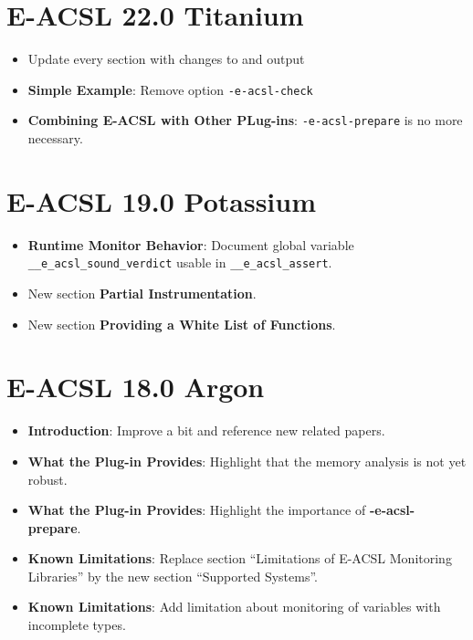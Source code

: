 \section*{E-ACSL 22.0 Titanium}

\begin{itemize}
\item Update every section with changes to \framac and \eacslgcc output
\item \textbf{Simple Example}: Remove option \texttt{-e-acsl-check}
\item \textbf{Combining E-ACSL with Other PLug-ins}: \texttt{-e-acsl-prepare} is
  no more necessary.
\end{itemize}

\section*{E-ACSL 19.0 Potassium}

\begin{itemize}
\item \textbf{Runtime Monitor Behavior}: Document global variable
  \texttt{\_\_e\_acsl\_sound\_verdict} usable in \texttt{\_\_e\_acsl\_assert}.
\item New section \textbf{Partial Instrumentation}.
\item New section \textbf{Providing a White List of Functions}.
\end{itemize}

\section*{E-ACSL 18.0 Argon}

\begin{itemize}
\item \textbf{Introduction}: Improve a bit and reference new related papers.
\item \textbf{What the Plug-in Provides}: Highlight that the memory analysis is
  not yet robust.
\item \textbf{What the Plug-in Provides}: Highlight the importance of
  \textbf{-e-acsl-prepare}.
\item \textbf{Known Limitations}: Replace section ``Limitations of E-ACSL
  Monitoring Libraries'' by the new section ``Supported Systems''.
\item \textbf{Known Limitations}: Add limitation about monitoring of variables
  with incomplete types.
\end{itemize}

